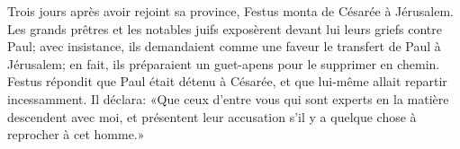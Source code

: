 Trois jours après avoir rejoint sa province,
	Festus monta de Césarée à Jérusalem.
Les grands prêtres et les notables juifs exposèrent devant lui leurs griefs contre Paul;
	avec insistance, ils demandaient comme une faveur le transfert de Paul à Jérusalem;
	en fait, ils préparaient un guet-apens pour le supprimer en chemin.
Festus répondit que Paul était détenu à Césarée,
	et que lui-même allait repartir incessamment.
Il déclara: «Que ceux d’entre vous qui sont experts en la matière
	descendent avec moi, et présentent leur accusation
	s’il y a quelque chose à reprocher à cet homme.»
